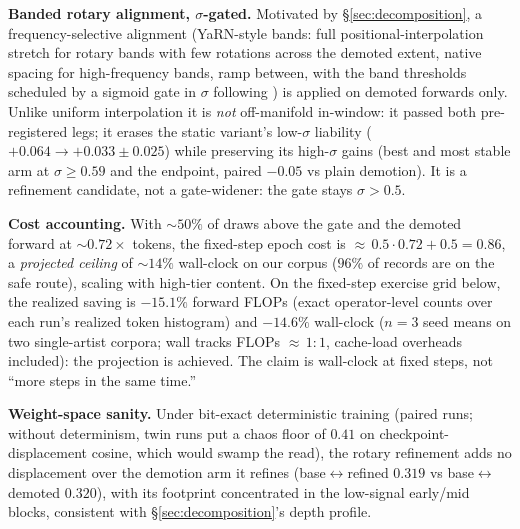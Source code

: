 \textbf{Banded rotary alignment, $\sigma$-gated.} Motivated by
\S\ref{sec:decomposition}, a frequency-selective alignment (YaRN-style
bands: full positional-interpolation stretch for rotary bands with few
rotations across the demoted extent, native spacing for high-frequency
bands, ramp between, with the band thresholds scheduled by a sigmoid
gate in $\sigma$ following \citealp{zhao2026sigma}) is applied on
demoted forwards only. Unlike uniform interpolation it is \emph{not}
off-manifold in-window: it passed both pre-registered legs; it erases
the static variant's low-$\sigma$ liability
($+0.064 \to +0.033 \pm 0.025$) while preserving its high-$\sigma$ gains
(best and most stable arm at $\sigma \ge 0.59$ and the endpoint, paired
$-0.05$ vs plain demotion). It is a refinement candidate, not a
gate-widener: the gate stays $\sigma > 0.5$.

\textbf{Cost accounting.} With ${\sim}50\%$ of draws above the gate and
the demoted forward at ${\sim}0.72\times$ tokens, the fixed-step epoch
cost is ${\approx}\,0.5 \cdot 0.72 + 0.5 = 0.86$, a \emph{projected
ceiling} of ${\sim}14\%$ wall-clock on our corpus ($96\%$ of records are
on the safe route), scaling with high-tier content. On the fixed-step
exercise grid below, the realized saving is $-15.1\%$ forward FLOPs
(exact operator-level counts over each run's realized token histogram)
and $-14.6\%$ wall-clock ($n{=}3$ seed means on two single-artist
corpora; wall tracks FLOPs ${\approx}\,1{:}1$, cache-load overheads
included): the projection is achieved. The claim is wall-clock at fixed
steps, not ``more steps in the same time.''

\textbf{Weight-space sanity.} Under bit-exact deterministic training
(paired runs; without determinism, twin runs put a chaos floor of $0.41$
on checkpoint-displacement cosine, which would swamp the read), the rotary
refinement adds no displacement over the demotion arm it refines
(base$\leftrightarrow$refined $0.319$ vs base$\leftrightarrow$demoted
$0.320$), with its footprint concentrated in the low-signal early/mid
blocks, consistent with \S\ref{sec:decomposition}'s depth profile.

